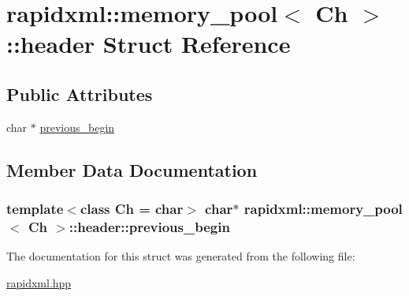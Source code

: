 \hypertarget{structrapidxml_1_1memory__pool_1_1header}{}\section{rapidxml\+:\+:memory\+\_\+pool$<$ Ch $>$\+:\+:header Struct Reference}
\label{structrapidxml_1_1memory__pool_1_1header}
\subsection*{Public Attributes}
\begin{DoxyCompactItemize}
\item 
char $\ast$ \hyperlink{structrapidxml_1_1memory__pool_1_1header_a3035f6741bb38f91c7f2efd05398c23d}{previous\+\_\+begin}
\end{DoxyCompactItemize}


\subsection{Member Data Documentation}
\hypertarget{structrapidxml_1_1memory__pool_1_1header_a3035f6741bb38f91c7f2efd05398c23d}{}
\subsubsection[{previous\+\_\+begin}]{\setlength{\rightskip}{0pt plus 5cm}template$<$class Ch  = char$>$ char$\ast$ {\bf rapidxml\+::memory\+\_\+pool}$<$ Ch $>$\+::header\+::previous\+\_\+begin}\label{structrapidxml_1_1memory__pool_1_1header_a3035f6741bb38f91c7f2efd05398c23d}


The documentation for this struct was generated from the following file\+:\begin{DoxyCompactItemize}
\item 
\hyperlink{rapidxml_8hpp}{rapidxml.\+hpp}\end{DoxyCompactItemize}
